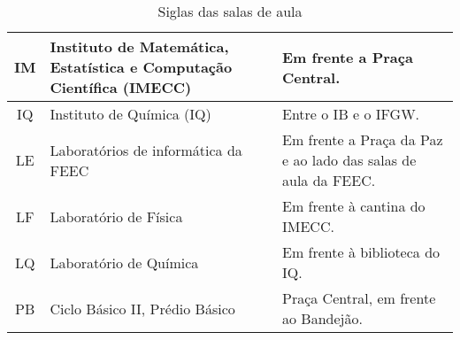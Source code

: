 \begin{table*}[ht!]
\begin{tabular}{|c|p{}|p{}|}
        IM  &  Instituto de Matemática, Estatística e Computação Científica (IMECC)  &  Em frente a Praça Central.\\ \hline

        IQ  &  Instituto de Química (IQ)  &  Entre o IB e o IFGW.\\ \hline

        LE  &  Laboratórios de informática da FEEC  &  Em frente a Praça da Paz e ao lado das salas de aula da FEEC.\\ \hline

        LF  &  Laboratório de Física  &  Em frente à cantina do IMECC.\\ \hline

        LQ  &  Laboratório de Química  &  Em frente à biblioteca do IQ.\\ \hline

        PB  &  Ciclo Básico II, Prédio Básico  &  Praça Central, em frente ao Bandejão.\\ \hline
    \end{tabular}
    \caption{Siglas das salas de aula}
    \label{tab:institutos}
\end{table*}
